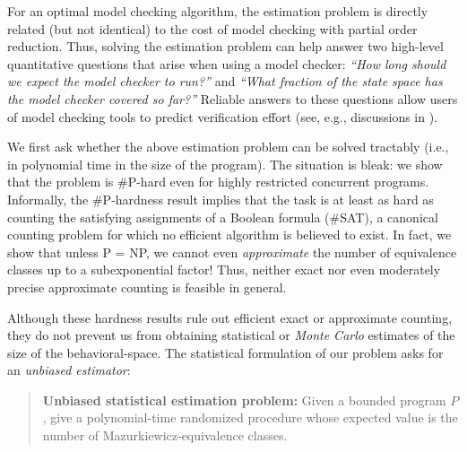 \documentclass[acmsmall]{acmart}
\begin{document}
For an optimal model checking algorithm, the estimation problem is directly related (but not identical) to the cost of model checking with partial order reduction.
Thus, solving the estimation problem can help answer two
high-level quantitative questions that arise when using a model checker:
\emph{``How long should we expect the model checker to run?''} and
\emph{``What fraction of the state space has the model checker covered so far?''}
Reliable answers to these questions allow users of model checking tools to predict verification effort (see, e.g., discussions in \cite{WangCGMK18,gator}).
%

We first ask whether the above estimation problem can be solved
tractably (i.e., in polynomial time in the size of the program).
The situation is bleak:
we show that the problem is \#P-hard even for highly restricted concurrent programs.
Informally, the \#P-hardness result implies that the task is at least as hard as
counting the satisfying assignments of a Boolean formula (\#SAT), a canonical
counting problem for which no efficient algorithm is believed to exist.
In fact, we show that unless \textsf{P} = \textsf{NP}, we cannot even \emph{approximate} the number of equivalence classes
up to a subexponential factor!
Thus, neither exact nor even moderately precise approximate
counting is feasible in general.

Although these hardness results rule out efficient exact or approximate
counting, they do not prevent us from obtaining statistical or \emph{Monte Carlo}
estimates of the size of the behavioral-space.
The statistical formulation of our problem asks for an \emph{unbiased estimator}:
\begin{quote}
{\bf Unbiased statistical estimation problem:} Given a bounded program \(P\), give a polynomial-time randomized procedure whose expected value is the number of Mazurkiewicz-equivalence classes.
\end{quote}
%
\end{document}
